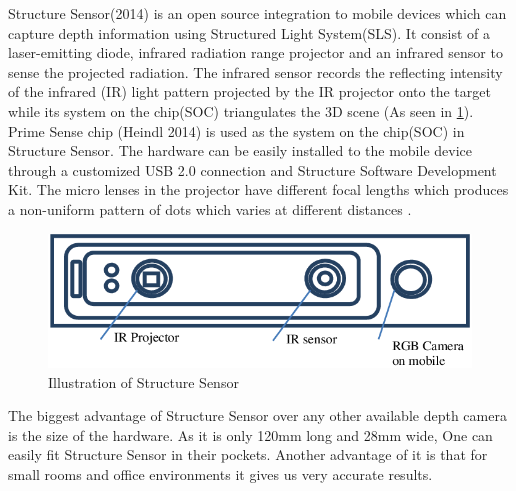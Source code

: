 Structure Sensor(2014) is an open source integration to mobile devices which can capture depth information using Structured Light System(SLS). It consist of a laser-emitting diode, infrared radiation range projector and an infrared sensor to sense the projected radiation. The infrared sensor records the reflecting intensity of the infrared (IR) light pattern projected by the IR projector onto the target while its system on the chip(SOC) triangulates the 3D scene \cite{Kalantari}(As seen in \ref{fig:Structuresensor}). Prime Sense chip (Heindl 2014) is used as the system on the chip(SOC) in Structure Sensor. The hardware can be easily installed to the mobile device through a customized USB 2.0 connection and Structure Software Development Kit. The micro lenses in the projector have different focal lengths which produces a non-uniform pattern of dots which varies at different distances \cite{Kalantari}. \\


\begin{figure}[h]
\centering
    \includegraphics[scale=0.29]{Figures/illustration-of-structure-sensor.png}
    \caption{Illustration of Structure Sensor}
    \label{fig:Structuresensor}
\end{figure}

The biggest advantage of Structure Sensor over any other available depth camera is the size of the hardware. As it is only 120mm long and 28mm wide, One can easily fit Structure Sensor in their pockets. Another advantage of it is that for small rooms and office environments it gives us very accurate results.